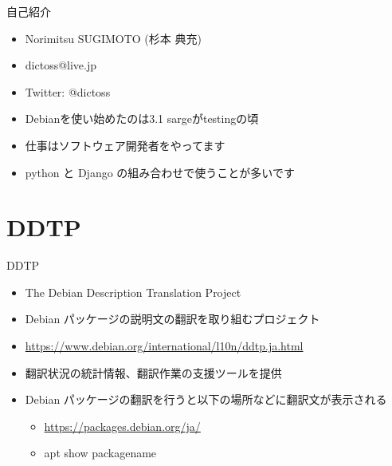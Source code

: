 \begin{frame}{自己紹介}
  \begin{itemize}
  \item Norimitsu SUGIMOTO (杉本 典充)
  \item dictoss@live.jp
  \item Twitter: @dictoss
  \item Debianを使い始めたのは3.1 sargeがtestingの頃
  \item 仕事はソフトウェア開発者をやってます
  \item python と Django の組み合わせで使うことが多いです
  \end{itemize}
\end{frame}


\section{DDTP}

\begin{frame}{DDTP}
  \begin{itemize}
  \item The Debian Description Translation Project
  \item Debian パッケージの説明文の翻訳を取り組むプロジェクト
  \item \url{https://www.debian.org/international/l10n/ddtp.ja.html}
  \item 翻訳状況の統計情報、翻訳作業の支援ツールを提供
  \item Debian パッケージの翻訳を行うと以下の場所などに翻訳文が表示される
    \begin{itemize}
    \item \url{https://packages.debian.org/ja/}
    \item apt show packagename
    \end{itemize}
  \end{itemize}
\end{frame}


